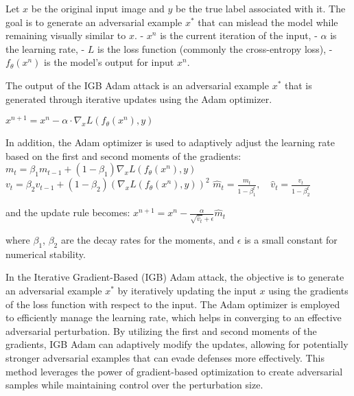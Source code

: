 Let $x$ be the original input image and $y$ be the true label associated with it. The goal is to generate an adversarial example $x^*$ that can mislead the model while remaining visually similar to $x$.
- $x^n$ is the current iteration of the input,
- $\alpha$ is the learning rate,
- $L$ is the loss function (commonly the cross-entropy loss),
- $f_\theta(x^n)$ is the model's output for input $x^n$.

The output of the IGB Adam attack is an adversarial example $x^*$ that is generated through iterative updates using the Adam optimizer.

$x^{n+1} = x^n - \alpha \cdot \nabla_x L(f_\theta(x^n), y)$

In addition, the Adam optimizer is used to adaptively adjust the learning rate based on the first and second moments of the gradients:
$m_t = \beta_1 m_{t-1} + (1 - \beta_1) \nabla_x L(f_\theta(x^n), y)$
$v_t = \beta_2 v_{t-1} + (1 - \beta_2) (\nabla_x L(f_\theta(x^n), y))^2$
$\hat{m}_t = \frac{m_t}{1 - \beta_1^t}, \quad \hat{v}_t = \frac{v_t}{1 - \beta_2^t}$

and the update rule becomes:
$x^{n+1} = x^n - \frac{\alpha}{\sqrt{\hat{v}_t} + \epsilon} \hat{m}_t$

where $\beta_1$, $\beta_2$ are the decay rates for the moments, and $\epsilon$ is a small constant for numerical stability.

In the  Iterative Gradient-Based (IGB) Adam attack, the objective is to generate an adversarial example $x^*$ by iteratively updating the input $x$ using the gradients of the loss function with respect to the input. The Adam optimizer is employed to efficiently manage the learning rate, which helps in converging to an effective adversarial perturbation. By utilizing the first and second moments of the gradients, IGB Adam can adaptively modify the updates, allowing for potentially stronger adversarial examples that can evade defenses more effectively. This method leverages the power of gradient-based optimization to create adversarial samples while maintaining control over the perturbation size.

